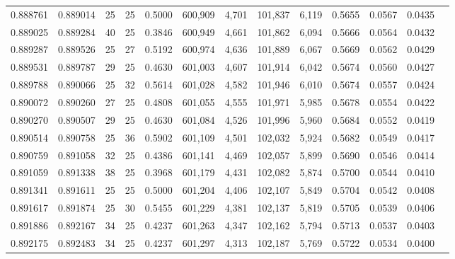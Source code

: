 \begin{tabular}{rrrrrrrrrrrrr}
0.888761 & 0.889014 &    25 &  25 &                                     0.5000 & 600,909 &   4,701 & 101,837 &   6,119 & 0.5655 & 0.0567 & 0.0435 \\
0.889025 & 0.889284 &    40 &  25 &                                     0.3846 & 600,949 &   4,661 & 101,862 &   6,094 & 0.5666 & 0.0564 & 0.0432 \\
0.889287 & 0.889526 &    25 &  27 &                                     0.5192 & 600,974 &   4,636 & 101,889 &   6,067 & 0.5669 & 0.0562 & 0.0429 \\
0.889531 & 0.889787 &    29 &  25 &                                     0.4630 & 601,003 &   4,607 & 101,914 &   6,042 & 0.5674 & 0.0560 & 0.0427 \\
0.889788 & 0.890066 &    25 &  32 &                                     0.5614 & 601,028 &   4,582 & 101,946 &   6,010 & 0.5674 & 0.0557 & 0.0424 \\
0.890072 & 0.890260 &    27 &  25 &                                     0.4808 & 601,055 &   4,555 & 101,971 &   5,985 & 0.5678 & 0.0554 & 0.0422 \\
0.890270 & 0.890507 &    29 &  25 &                                     0.4630 & 601,084 &   4,526 & 101,996 &   5,960 & 0.5684 & 0.0552 & 0.0419 \\
0.890514 & 0.890758 &    25 &  36 &                                     0.5902 & 601,109 &   4,501 & 102,032 &   5,924 & 0.5682 & 0.0549 & 0.0417 \\
0.890759 & 0.891058 &    32 &  25 &                                     0.4386 & 601,141 &   4,469 & 102,057 &   5,899 & 0.5690 & 0.0546 & 0.0414 \\
0.891059 & 0.891338 &    38 &  25 &                                     0.3968 & 601,179 &   4,431 & 102,082 &   5,874 & 0.5700 & 0.0544 & 0.0410 \\
0.891341 & 0.891611 &    25 &  25 &                                     0.5000 & 601,204 &   4,406 & 102,107 &   5,849 & 0.5704 & 0.0542 & 0.0408 \\
0.891617 & 0.891874 &    25 &  30 &                                     0.5455 & 601,229 &   4,381 & 102,137 &   5,819 & 0.5705 & 0.0539 & 0.0406 \\
0.891886 & 0.892167 &    34 &  25 &                                     0.4237 & 601,263 &   4,347 & 102,162 &   5,794 & 0.5713 & 0.0537 & 0.0403 \\
0.892175 & 0.892483 &    34 &  25 &                                     0.4237 & 601,297 &   4,313 & 102,187 &   5,769 & 0.5722 & 0.0534 & 0.0400 \\

\end{tabular}
